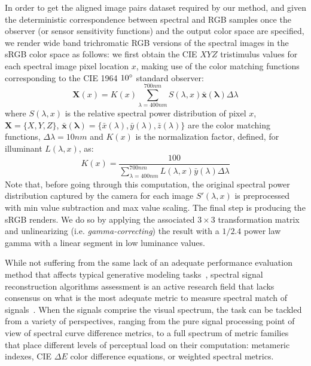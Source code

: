 \documentclass[10pt,twocolumn,letterpaper]{article}
\begin{document}
In order to get the aligned image pairs dataset required by our method, and given the deterministic correspondence between spectral and RGB samples once the observer (or sensor sensitivity functions) and the output color space are specified, we render wide band trichromatic RGB versions of the spectral images in the sRGB color space as follows: we first obtain the CIE $XYZ$ tristimulus values for each spectral image pixel location $x$, making use of the color matching functions corresponding to the CIE 1964 $10\degree$ standard observer:
\begin{equation} \label{eq:trix}
\mathbf{X}(x)=K(x)\sum_{\lambda=400nm}^{700nm}S(\lambda, x)\mathbf{\bar{x}(\lambda)}\Delta\lambda
\end{equation}
where $S(\lambda, x)$ is the relative spectral power distribution of pixel $x$, $\mathbf{X}=\{X,Y,Z\}$, $\mathbf{\bar{x}(\lambda)}=\{\bar{x}(\lambda), \bar{y}(\lambda), \bar{z}(\lambda)\}$ are the color matching functions, $\Delta\lambda=10nm$ and $K(x)$ is the normalization factor, defined, for illuminant $L(\lambda, x)$, as:
\begin{equation} \label{eq:trik}
K(x)=\frac{100}{\sum_{\lambda=400nm}^{700nm}L(\lambda, x)\bar{y}(\lambda)\Delta\lambda}
\end{equation}
Note that, before going through this computation, the original spectral power distribution captured by the camera for each image $S'(\lambda, x)$ is preprocessed with min value subtraction and max value scaling.
The final step is producing the sRGB renders. We do so by applying the associated $3\times3$ transformation matrix and unlinearizing (i.e. \emph{gamma-correcting}) the result with a $1/2.4$ power law gamma with a linear segment in low luminance values.

While not suffering from the same lack of an adequate performance evaluation method that affects typical generative modeling tasks~\cite{theis_note_2016}, spectral signal reconstruction algorithms assessment is an active research field that lacks consensus on what is the most adequate metric to measure spectral match of signals~\cite{imai_comparative_2002}.
When the signals comprise the visual spectrum, the task can be tackled from a variety of perspectives, ranging from the pure signal processing point of view of spectral curve difference metrics, to a full spectrum of metric families that place different levels of perceptual load on their computation: metameric indexes, CIE $\Delta E$ color difference equations, or weighted spectral metrics.
\end{document}
